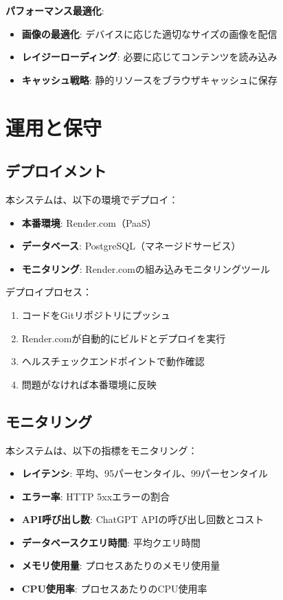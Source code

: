 \documentclass[a4paper,11pt,ja=standard,xelatex]{bxjsarticle}
\theoremstyle{definition}
\begin{document}
\textbf{パフォーマンス最適化}:
\begin{itemize}
\item \textbf{画像の最適化}: デバイスに応じた適切なサイズの画像を配信
\item \textbf{レイジーローディング}: 必要に応じてコンテンツを読み込み
\item \textbf{キャッシュ戦略}: 静的リソースをブラウザキャッシュに保存
\end{itemize}

\section{運用と保守}

\subsection{デプロイメント}

本システムは、以下の環境でデプロイ：
\begin{itemize}
\item \textbf{本番環境}: Render.com（PaaS）
\item \textbf{データベース}: PostgreSQL（マネージドサービス）
\item \textbf{モニタリング}: Render.comの組み込みモニタリングツール
\end{itemize}

デプロイプロセス：
\begin{enumerate}
\item コードをGitリポジトリにプッシュ
\item Render.comが自動的にビルドとデプロイを実行
\item ヘルスチェックエンドポイントで動作確認
\item 問題がなければ本番環境に反映
\end{enumerate}

\subsection{モニタリング}

本システムは、以下の指標をモニタリング：
\begin{itemize}
\item \textbf{レイテンシ}: 平均、95パーセンタイル、99パーセンタイル
\item \textbf{エラー率}: HTTP 5xxエラーの割合
\item \textbf{API呼び出し数}: ChatGPT APIの呼び出し回数とコスト
\item \textbf{データベースクエリ時間}: 平均クエリ時間
\item \textbf{メモリ使用量}: プロセスあたりのメモリ使用量
\item \textbf{CPU使用率}: プロセスあたりのCPU使用率
\end{itemize}
\end{document}
